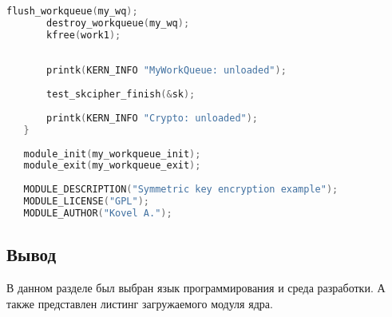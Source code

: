 \begin{lstlisting}[language=c, label=rudakov-menya-ne-spaset, caption=Загружаемый модуль ядра]
       flush_workqueue(my_wq);
       destroy_workqueue(my_wq);
       kfree(work1);
   
       
       printk(KERN_INFO "MyWorkQueue: unloaded");
   
       test_skcipher_finish(&sk);
   
       printk(KERN_INFO "Crypto: unloaded");
   }
    
   module_init(my_workqueue_init);
   module_exit(my_workqueue_exit);
    
   MODULE_DESCRIPTION("Symmetric key encryption example");
   MODULE_LICENSE("GPL");
   MODULE_AUTHOR("Kovel A.");    
\end{lstlisting}

\subsection*{Вывод}

В данном разделе был выбран язык программирования и среда разработки.
А также представлен листинг загружаемого модуля ядра.